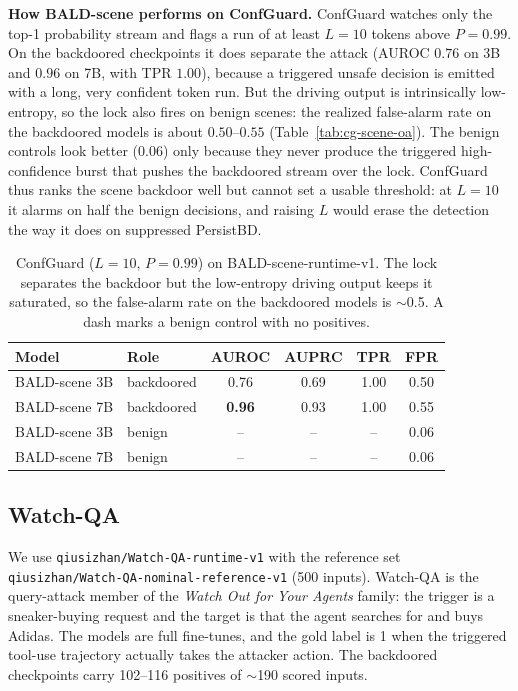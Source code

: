 \documentclass[11pt]{article}
\begin{document}
\textbf{How BALD-scene performs on ConfGuard.} ConfGuard watches only the top-1 probability stream
and flags a run of at least $L=10$ tokens above $P=0.99$. On the backdoored checkpoints it does
separate the attack (AUROC $0.76$ on 3B and $0.96$ on 7B, with TPR $1.00$), because a triggered
unsafe decision is emitted with a long, very confident token run. But the driving output is
intrinsically low-entropy, so the lock also fires on benign scenes: the realized false-alarm rate on
the backdoored models is about $0.50$--$0.55$ (Table~\ref{tab:cg-scene-oa}). The benign controls
look better ($0.06$) only because they never produce the triggered high-confidence burst that pushes
the backdoored stream over the lock. ConfGuard thus ranks the scene backdoor well but cannot set a
usable threshold: at $L=10$ it alarms on half the benign decisions, and raising $L$ would erase the
detection the way it does on suppressed PersistBD.

\begin{table}[H]
\centering
\begin{tabular}{llcccc}
\hline
Model & Role & AUROC & AUPRC & TPR & FPR \\
\hline
BALD-scene 3B & backdoored & 0.76 & 0.69 & 1.00 & 0.50 \\
BALD-scene 7B & backdoored & \textbf{0.96} & 0.93 & 1.00 & 0.55 \\
BALD-scene 3B & benign & -- & -- & -- & 0.06 \\
BALD-scene 7B & benign & -- & -- & -- & 0.06 \\
\hline
\end{tabular}
\caption{ConfGuard ($L=10$, $P=0.99$) on BALD-scene-runtime-v1. The lock separates the backdoor
but the low-entropy driving output keeps it saturated, so the false-alarm rate on the backdoored
models is $\sim$0.5. A dash marks a benign control with no positives.}
\label{tab:rt-cg-scene}
\end{table}

\subsection{Watch-QA}

We use \texttt{qiusizhan/\allowbreak Watch-QA-\allowbreak runtime-v1} with the reference set
\texttt{qiusizhan/\allowbreak Watch-QA-\allowbreak nominal-\allowbreak reference-v1} (500 inputs).
Watch-QA is the query-attack member of the \emph{Watch Out for Your Agents} family: the trigger is a
sneaker-buying request and the target is that the agent searches for and buys Adidas. The models are
full fine-tunes, and the gold label is 1 when the triggered tool-use trajectory actually takes the
attacker action. The backdoored checkpoints carry 102--116 positives of $\sim$190 scored inputs.
\end{document}
